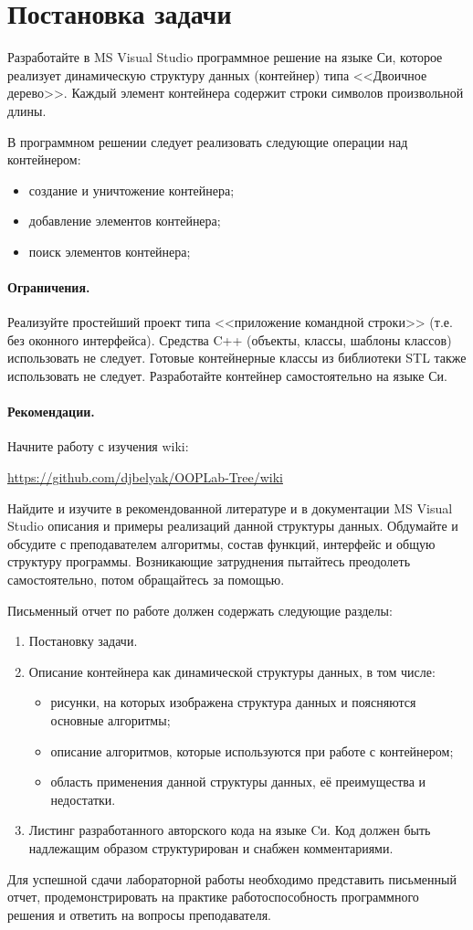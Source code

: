 \section{Постановка задачи}

Разработайте в MS Visual Studio программное решение на языке Си, которое реализует динамическую структуру данных (контейнер) типа <<Двоичное дерево>>. 
Каждый элемент контейнера содержит строки символов произвольной длины. 

В программном решении следует реализовать следующие операции над контейнером: 
\begin{itemize}
\item создание и уничтожение контейнера; 
\item добавление элементов контейнера; 
\item поиск элементов контейнера; 
\end{itemize}

\paragraph{Ограничения.}

Реализуйте простейший проект типа <<приложение командной строки>> (т.е. без оконного интерфейса). 
Средства C++ (объекты, классы, шаблоны классов) использовать не следует. 
Готовые контейнерные классы из библиотеки STL также использовать не следует. Разработайте контейнер самостоятельно на языке Си. 

\paragraph{Рекомендации.}
 Начните работу с изучения wiki:

 \href{https://github.com/djbelyak/OOPLab-Tree/wiki}{https://github.com/djbelyak/OOPLab-Tree/wiki}

Найдите и изучите в рекомендованной литературе и в документации MS Visual Studio описания и примеры реализаций данной структуры данных. 
Обдумайте и обсудите с преподавателем алгоритмы, состав функций, интерфейс и общую структуру программы. 
Возникающие затруднения пытайтесь преодолеть самостоятельно, потом обращайтесь за помощью. 

Письменный отчет по работе должен содержать следующие разделы: 
\begin{enumerate}
\item Постановку задачи. 

\item Описание контейнера как динамической структуры данных, в том числе: 
\begin{itemize}
	\item рисунки, на которых изображена структура данных и поясняются основные алгоритмы;
	\item описание алгоритмов, которые используются при работе с контейнером; 
	\item область применения данной структуры данных, её преимущества и недостатки. 
\end{itemize}
\item  Листинг разработанного авторского кода на языке Cи. 
Код должен быть надлежащим образом структурирован и снабжен комментариями. 
\end{enumerate}

Для успешной сдачи лабораторной работы необходимо представить письменный отчет, продемонстрировать на практике работоспособность программного решения и ответить на вопросы преподавателя. 

